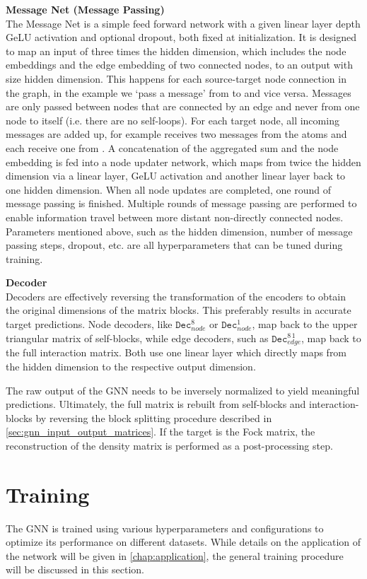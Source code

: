 \textbf{Message Net (Message Passing)}\\
The Message Net is a simple feed forward network with a given linear layer depth GeLU activation and optional dropout, both fixed at initialization. It is designed to map an input of three times the hidden dimension, which includes the node embeddings and the edge embedding of two connected nodes, to an output with size hidden dimension. This happens for each source-target node connection in the graph, in the example we `pass a message' from  to  and vice versa. Messages are only passed between nodes that are connected by an edge and never from one node to itself (i.e. there are no self-loops). For each target node, all incoming messages are added up, for  example  receives two messages from the  atoms and each  receive one from . A concatenation of the aggregated sum and the node embedding is fed into a node updater network, which maps from twice the hidden dimension via a linear layer, GeLU activation and another linear layer back to one hidden dimension. When all node updates are completed, one round of message passing is finished. Multiple rounds of message passing are performed to enable information travel between more distant non-directly connected nodes.\\
Parameters mentioned above, such as the hidden dimension, number of message passing steps, dropout, etc. are all hyperparameters that can be tuned during training. 

\textbf{Decoder}\\
Decoders are effectively reversing the transformation of the encoders to obtain the original dimensions of the matrix blocks. This preferably results in accurate target predictions. Node decoders, like $\texttt{Dec}^{8}_{node}$ or  $\texttt{Dec}^{1}_{node}$, map back to the upper triangular matrix of self-blocks, while edge decoders, such as $\texttt{Dec}^{8\,1}_{edge}$, map back to the full interaction matrix. Both use one linear layer which directly maps from the hidden dimension to the respective output dimension.

The raw output of the GNN needs to be inversely normalized to yield meaningful predictions. Ultimately, the full matrix is rebuilt from self-blocks and interaction-blocks by reversing the block splitting procedure described in \autoref{sec:gnn_input_output_matrices}. If the target is the Fock matrix, the reconstruction of the density matrix is performed as a post-processing step.

\section{Training}
\label{sec:gnn_training}
The GNN is trained using various hyperparameters and configurations to optimize its performance on different datasets. While details on the application of the network will be given in \autoref{chap:application}, the general training procedure will be discussed in this section.

